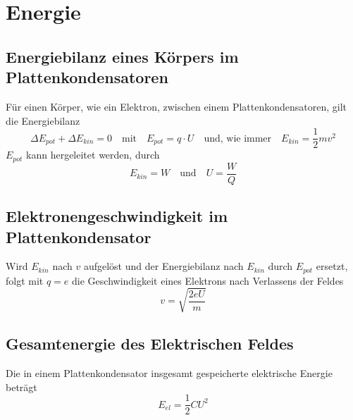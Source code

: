 \documentclass{article}
\begin{document}
 
\section{Energie} 
\subsection{Energiebilanz eines Körpers im Plattenkondensatoren}
Für einen Körper, wie ein Elektron, zwischen einem Plattenkondensatoren, gilt die Energiebilanz
\[
 \Delta E_{pot} + \Delta E_{kin} = 0
 \quad \text{mit} \quad
 E_{pot} = q \cdot U
 \quad \text{und, wie immer} \quad
 E_{kin} = \frac{1}{2} mv^2
\] 
$E_{pot}$ kann hergeleitet werden, durch 
\[
 E_{kin} = W
 \quad \text{und} \quad
 U = \frac{W}{Q} 
\] 
 
\subsection{Elektronengeschwindigkeit im Plattenkondensator} 
Wird $E_{kin}$ nach $v$ aufgelöst und der Energiebilanz nach $E_{kin}$ durch $E_{pot}$ ersetzt, folgt mit $q=e$ die Geschwindigkeit eines Elektrons nach Verlassens der Feldes
\[
 v = \sqrt{\frac{2 eU}{m}}
\] 
 
\subsection{Gesamtenergie des Elektrischen Feldes}
Die in einem Plattenkondensator insgesamt gespeicherte elektrische Energie beträgt
\[
 E_{el} = \frac{1}{2} CU^2
\] 
 
\end{document}
